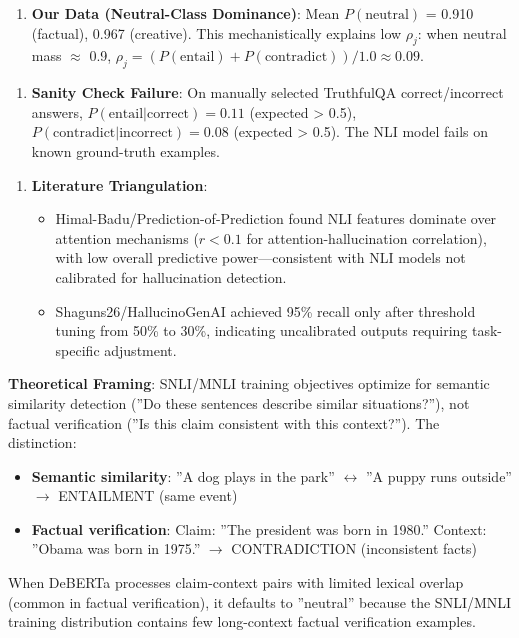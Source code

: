 \begin{enumerate}
\item \textbf{Our Data (Neutral-Class Dominance)}: Mean $P(\text{neutral})$ = 0.910 (factual), 0.967 (creative). This mechanistically explains low $\rho_j$: when neutral mass $\approx$ 0.9, $\rho_j = (P(\text{entail}) + P(\text{contradict})) / 1.0 \approx 0.09$.
\end{enumerate}

\begin{enumerate}
\item \textbf{Sanity Check Failure}: On manually selected TruthfulQA correct/incorrect answers, $P(\text{entail}|\text{correct}) = 0.11$ (expected > 0.5), $P(\text{contradict}|\text{incorrect}) = 0.08$ (expected > 0.5). The NLI model fails on known ground-truth examples.
\end{enumerate}

\begin{enumerate}
\item \textbf{Literature Triangulation}:
\begin{itemize}
\item Himal-Badu/Prediction-of-Prediction found NLI features dominate over attention mechanisms ($r < 0.1$ for attention-hallucination correlation), with low overall predictive power---consistent with NLI models not calibrated for hallucination detection.
\item Shaguns26/HallucinoGenAI achieved 95\% recall only after threshold tuning from 50\% to 30\%, indicating uncalibrated outputs requiring task-specific adjustment.
\end{itemize}
\end{enumerate}

\textbf{Theoretical Framing}: SNLI/MNLI training objectives optimize for semantic similarity detection (''Do these sentences describe similar situations?''), not factual verification (''Is this claim consistent with this context?''). The distinction:
\begin{itemize}
\item \textbf{Semantic similarity}: ''A dog plays in the park'' $\leftrightarrow$ ''A puppy runs outside'' $\rightarrow$ ENTAILMENT (same event)
\item \textbf{Factual verification}: Claim: ''The president was born in 1980.'' Context: ''Obama was born in 1975.'' $\rightarrow$ CONTRADICTION (inconsistent facts)
\end{itemize}

When DeBERTa processes claim-context pairs with limited lexical overlap (common in factual verification), it defaults to ''neutral'' because the SNLI/MNLI training distribution contains few long-context factual verification examples.

